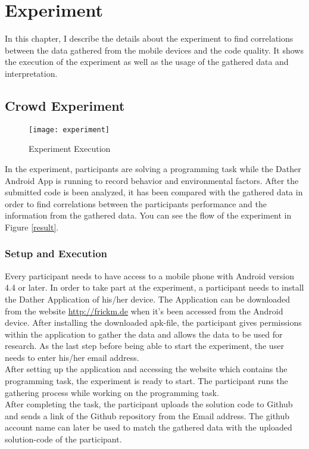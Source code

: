 \chapter{Experiment}
In this chapter, I describe the details about the experiment to find correlations between the data gathered from the mobile devices and the code quality. It shows the execution of the experiment as well as the usage of the gathered data and interpretation. 


\section{Crowd Experiment}

\begin{figure}
\texttt{[image: experiment]}
\caption{Experiment Execution}\label{experiment}
\vspace{10 mm}
\end{figure}

In the experiment, participants are solving a programming task while the Dather Android App is running to record behavior and environmental factors. After the submitted code is been analyzed, it has been compared with the gathered data in order to find correlations between the participants performance and the information from the gathered data. You can see the flow of the experiment in Figure \ref{result}. 
\subsection{Setup and Execution}
Every participant needs to have access to a mobile phone with Android version 4.4 or later. In order to take part at the experiment, a participant needs to install the Dather Application of his/her device. The Application can be downloaded from the website \url{http://frickm.de} when it's been accessed from the Android device. 
\bigbreak
After installing the downloaded apk-file, the participant gives permissions within the application to gather the data and allows the data to be used for research. 
As the last step before being able to start the experiment, the user needs to enter his/her email address.\\
After setting up the application and accessing the website which contains the programming task, the experiment is ready to start. The participant runs the gathering process while working on the programming task.\\
After completing the task, the participant uploads the solution code to Github and sends a link of the Github repository from the Email address. The github account name can later be used to match the gathered data with the uploaded solution-code of the participant. 

